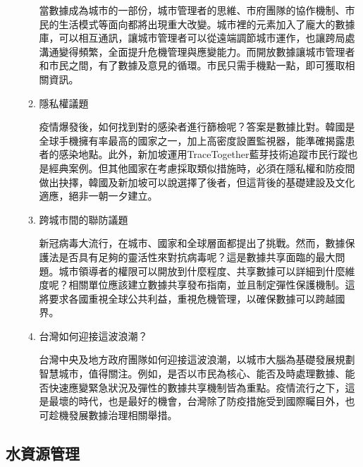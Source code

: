 \documentclass[a4paper,12pt]{article}
\begin{document}
\begin{enumerate}
\begin{enumerate}
當數據成為城市的一部份，城市管理者的思維、市府團隊的協作機制、市民的生活模式等面向都將出現重大改變。城市裡的元素加入了龐大的數據庫，可以相互通訊，讓城市管理者可以從遠端調節城市運作，也讓跨局處溝通變得頻繁，全面提升危機管理與應變能力。而開放數據讓城市管理者和市民之間，有了數據及意見的循環。市民只需手機點一點，即可獲取相關資訊。\\
\item 隱私權議題
\label{sec:orge37d03c}

疫情爆發後，如何找到對的感染者進行篩檢呢？答案是數據比對。韓國是全球手機擁有率最高的國家之一，加上高密度設置監視器，能準確揭露患者的感染地點。此外，新加坡運用TraceTogether藍芽技術追蹤市民行蹤也是經典案例。但其他國家在考慮採取類似措施時，必須在隱私權和防疫間做出抉擇，韓國及新加坡可以說選擇了後者，但這背後的基礎建設及文化適應，絕非一朝一夕建立。\\
\item 跨城市間的聯防議題
\label{sec:org4cf9936}

新冠病毒大流行，在城市、國家和全球層面都提出了挑戰。然而，數據保護法是否具有足夠的靈活性來對抗病毒呢？這是數據共享面臨的最大問題。城市領導者的權限可以開放到什麼程度、共享數據可以詳細到什麼維度呢？相關單位應該建立數據共享發布指南，並且制定彈性保護機制。這將要求各國重視全球公共利益，重視危機管理，以確保數據可以跨越國界。\\
\item 台灣如何迎接這波浪潮？
\label{sec:org642e207}

台灣中央及地方政府團隊如何迎接這波浪潮，以城市大腦為基礎發展規劃智慧城市，值得關注。例如，是否以市民為核心、能否及時處理數據、能否快速應變緊急狀況及彈性的數據共享機制皆為重點。疫情流行之下，這是最壞的時代，也是最好的機會，台灣除了防疫措施受到國際矚目外，也可趁機發展數據治理相關舉措。\\
\newpage
\end{enumerate}
\end{enumerate}

\subsection{水資源管理}
\label{sec:org640478d}
\end{document}
